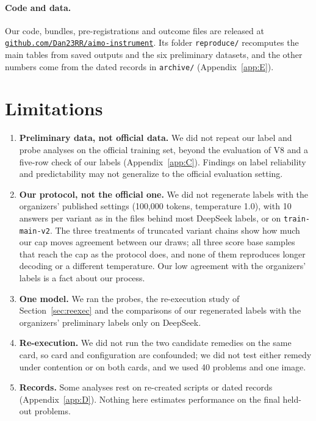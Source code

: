 \documentclass{article}
\begin{document}
\paragraph{Code and data.} Our code, bundles, pre-registrations and outcome files are released at \href{https://github.com/Dan23RR/aimo-instrument}{\nolinkurl{github.com/Dan23RR/aimo-instrument}}. Its folder \texttt{reproduce/} recomputes the main tables from saved outputs and the six preliminary datasets, and the other numbers come from the dated records in \texttt{archive/} (Appendix~\ref{app:E}).

\label{fine-testo}

\section*{Limitations}

\begin{enumerate}[leftmargin=1.6em, itemsep=2pt, topsep=4pt, parsep=0pt]
\item \textbf{Preliminary data, not official data.} We did not repeat our label and probe analyses on the official training set, beyond the evaluation of V8 and a five-row check of our labels (Appendix~\ref{app:C}). Findings on label reliability and predictability may not generalize to the official evaluation setting.
\item \textbf{Our protocol, not the official one.} We did not regenerate labels with the organizers' published settings (100,000 tokens, temperature 1.0), with 10 answers per variant as in the files behind most DeepSeek labels, or on \texttt{train-main-v2}. The three treatments of truncated variant chains show how much our cap moves agreement between our draws; all three score base samples that reach the cap as the protocol does, and none of them reproduces longer decoding or a different temperature. Our low agreement with the organizers' labels is a fact about our process.
\item \textbf{One model.} We ran the probes, the re-execution study of Section~\ref{sec:reexec} and the comparisons of our regenerated labels with the organizers' preliminary labels only on DeepSeek.
\item \textbf{Re-execution.} We did not run the two candidate remedies on the same card, so card and configuration are confounded; we did not test either remedy under contention or on both cards, and we used 40 problems and one image.
\item \textbf{Records.} Some analyses rest on re-created scripts or dated records (Appendix~\ref{app:D}). Nothing here estimates performance on the final held-out problems.
\end{enumerate}
\end{document}

